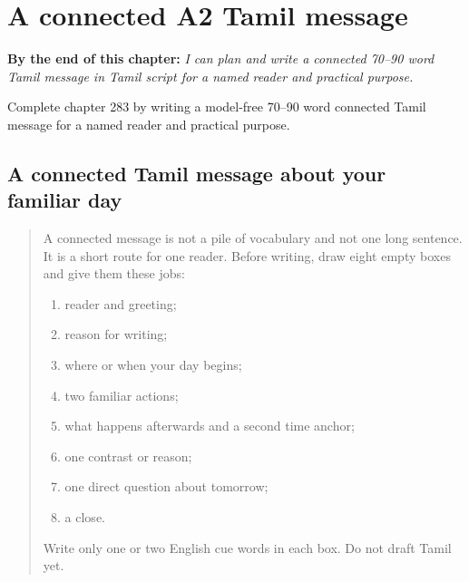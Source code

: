 
\chapter{A connected A2 Tamil message}
\label{ch:ta-a-connected-a2-tamil-message}

\begin{chapteropening}
\textbf{By the end of this chapter:} \emph{I can plan and write a connected 70–90 word Tamil message in Tamil script for a named reader and practical purpose.}

Complete chapter 283 by writing a model-free 70–90 word connected Tamil message for a named reader and practical purpose.
\end{chapteropening}

\section[(connected A2 Tamil writing)]{A connected Tamil message about your familiar day}

\label{lesson:TA-W283-a2-connected-composition}



\begin{quote}
A connected message is not a pile of vocabulary and not one long sentence. It is a short route for one reader. Before writing, draw eight empty boxes and give them these jobs:

\begin{enumerate}
\raggedright
  \item reader and greeting;
  \item reason for writing;
  \item where or when your day begins;
  \item two familiar actions;
  \item what happens afterwards and a second time anchor;
  \item one contrast or reason;
  \item one direct question about tomorrow;
  \item a close.
\end{enumerate}

Write only one or two English cue words in each box. Do not draft Tamil yet.
\end{quote}

